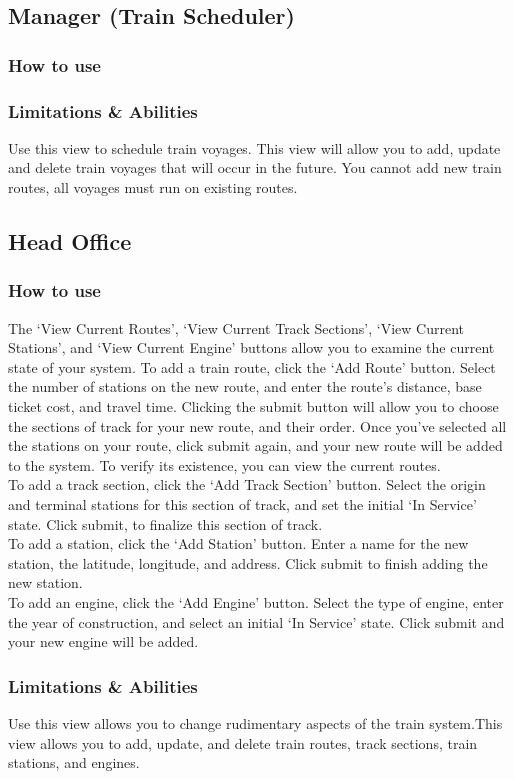 \documentclass[letter]{article}
\begin{document}
\subsection{Manager (Train Scheduler)}
\subsubsection{How to use}

\subsubsection{Limitations \& Abilities}
Use this view to schedule train voyages. This view will allow you to add, update and delete train voyages that will occur in the future. You cannot add new train routes, all voyages must run on existing routes. 


\subsection{Head Office}
\subsubsection{How to use}
The `View Current Routes', `View Current Track Sections', `View Current Stations', and `View Current Engine' buttons allow you to examine the current state of your system.
To add a train route, click the `Add Route' button. Select the number of stations on the new route, and enter the route's distance, base ticket cost, and travel time. Clicking the submit button will allow you to choose the sections of track for your new route, and their order. Once you've selected all the stations on your route, click submit again, and your new route will be added to the system. To verify its existence, you can view the current routes.\\
To add a track section, click the `Add Track Section' button. Select the origin and terminal stations for this section of track, and set the initial `In Service' state. Click submit, to finalize this section of track. \\
To add a station, click the `Add Station' button. Enter a name for the new station, the latitude, longitude, and address. Click submit to finish adding the new station. \\
To add an engine, click the `Add Engine' button. Select the type of engine, enter the year of construction, and select an initial `In Service' state. Click submit and your new engine will be added.
\subsubsection{Limitations \& Abilities}
Use this view allows you to change rudimentary aspects of the train system.This view allows you to add, update, and delete train routes, track sections, train stations, and engines.
\end{document}
